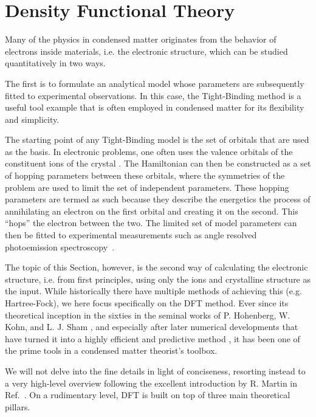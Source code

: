 \chapter{Density Functional Theory \label{ch:DFT}}
Many of the physics in condensed matter originates from the behavior of electrons inside materials, i.e. the electronic structure, which can be studied quantitatively in two ways.

The first is to formulate an analytical model whose parameters are subsequently fitted to experimental observations. 
In this case, the Tight-Binding method is a useful tool example that is often employed in condensed matter for its flexibility and simplicity.

The starting point of any Tight-Binding model is the set of orbitals that are used as the basis.
In electronic problems, one often uses the valence orbitals of the constituent ions of the crystal \cite{Bloch1929,Slater1954}.
The Hamiltonian can then be constructed as a set of hopping parameters between these orbitals, where the symmetries of the problem are used to limit the set of independent parameters.
These hopping parameters are termed as such because they describe the energetics the process of annihilating an electron on the first orbital and creating it on the second.
This ``hops'' the electron between the two.
The limited set of model parameters can then be fitted to experimental measurements such as angle resolved photoemission spectroscopy~\cite{Damascelli2004}.

The topic of this Section, however, is the second way of calculating the electronic structure, i.e. from first principles, using only the ions and crystalline structure as the input. 
While historically there have multiple methods of achieving this (e.g. Hartree-Fock), we here focus specifically on the \gls{DFT} method.
Ever since its theoretical inception in the sixties in the seminal works of P. Hohenberg, W. Kohn, and L. J. Sham  \cite{Hohenberg1964,Kohn1965}, and especially after later numerical developments that have turned it into a highly efficient and predictive method \cite{Hamann1979,Louie1982,Vanderbilt1990,Joubert1999,Perdew1985,Perdew1986,Perdew1993}, it has been one of the prime tools in a condensed matter theorist's toolbox.

We will not delve into the fine details in light of conciseness, resorting instead to a very high-level overview following the excellent introduction by R. Martin in Ref.~\cite{Martin2004}.
On a rudimentary level, \gls{DFT} is built on top of three main theoretical pillars.

